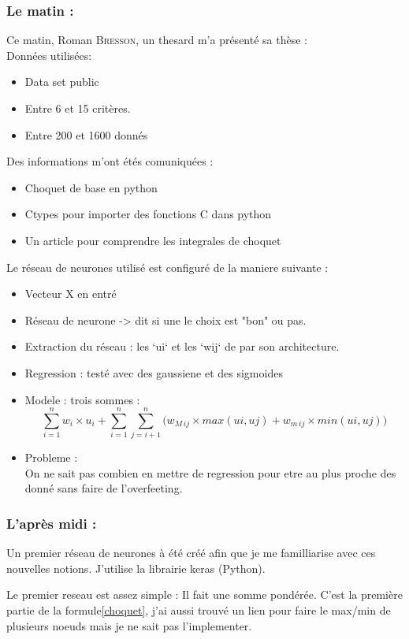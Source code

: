 ﻿\subsubsection*{Le matin :}
Ce matin, Roman \textsc{Bresson}, un thesard m'a présenté sa thèse : \\


Données utilisées:
\begin{itemize}
    \item Data set public
    \item Entre 6 et 15 critères.
    \item Entre 200 et 1600 donnés
\end{itemize}


Des informations m'ont étés comuniquées :
\begin{itemize}
    \item Choquet de base en python
    \item Ctypes pour importer des fonctions C dans python
    \item Un article pour comprendre les integrales de choquet\cite{grabisch2016fuzzy}
\end{itemize}


Le réseau de neurones utilisé est configuré de la maniere suivante :
\begin{itemize}
     \item Vecteur X en entré
     \item Réseau de neurone -> dit si une le choix est "bon" ou pas.
     \item Extraction du réseau : les `ui` et les `wij` de par son architecture.
     \item Regression : testé avec des gaussiene et des sigmoides
     \item Modele : trois sommes :
        \begin{equation}
            \label{choquet}
            \sum_{i=1}^{n}
                w_i \times u_i +
            \sum_{i=1}^{n}\sum_{j=i+1}^{n}
            \Big(
                w_{M\,ij} \times max(ui,uj) + w_{m\,ij} \times min(ui,uj)
            \Big)
        \end{equation}
    \item Probleme : \\
        On ne sait pas combien en mettre de regression pour etre au plus proche des donné sans faire de l'overfeeting.
\end{itemize}

\subsubsection*{L'après midi :}
Un premier réseau de neurones à été créé afin que je me familliarise avec ces nouvelles notions.
J'utilise la librairie keras\cite{keras} (Python).


Le premier reseau est assez simple : Il fait une somme pondérée.
C'est la première partie de la formule\ref{choquet}, j'ai aussi trouvé un lien pour faire le max/min de plusieurs
noeuds mais je ne sait pas l'implementer.

